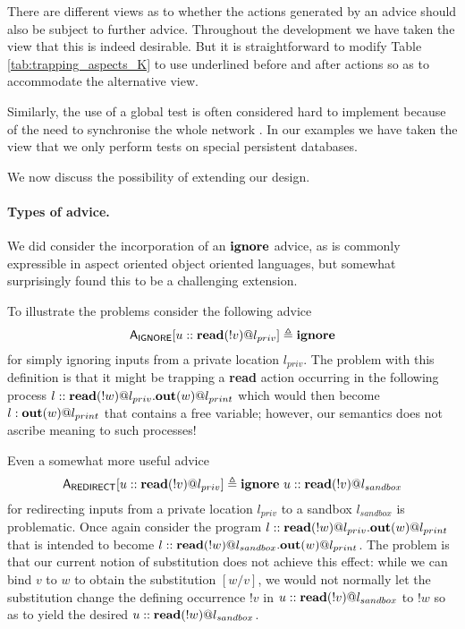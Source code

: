 \documentclass[a4paper]{llncs}
\begin{document}
There are different views as to whether the actions generated by an advice should also be subject to further advice. Throughout the development we have taken the view that this is indeed desirable. But it is straightforward to modify Table \ref{tab:trapping_aspects_K} to use underlined before and after actions so as to accommodate the alternative view. 

Similarly, the use of a global test is often considered hard to implement because of the need to synchronise the whole network \cite{De1998}. In our examples we have taken the view that we only perform tests on special persistent databases.

We now discuss the possibility of extending
our design.

\paragraph{Types of advice.}

We did consider the incorporation of an ${\bf ignore}$ advice, as is
commonly expressible in aspect oriented object oriented languages, but
somewhat surprisingly found this to be a challenging extension.

To illustrate the problems consider the following advice
$${\sf A}_{\sf IGNORE}[u::{\bf read}(!v)@l_{priv}] \triangleq {\bf ignore}$$
for simply ignoring inputs from a private location $l_{priv}$.  The
problem with this definition is that it might be trapping a {\bf read}
action occurring in the following process $l::{\bf
read}(!w)@l_{priv}. {\bf out}(w)@l_{print}$ which would then become
$l:{\bf out}(w)@l_{print}$ that contains a free variable; however, our
semantics does not ascribe meaning to such processes!

Even a somewhat more useful advice
$${\sf A}_{\sf REDIRECT}[u::{\bf read}(!v)@l_{priv}] \triangleq 
  {\bf ignore}\ u::{\bf read}(!v)@l_{sandbox}
$$
for redirecting inputs from a private location $l_{priv}$ to a sandbox
$l_{sandbox}$ is problematic.
Once again consider the program
$l::{\bf read}(!w)@l_{priv}. {\bf out}(w)@l_{print}$
that is intended to become
$l::{\bf read}(!w)@l_{sandbox}. {\bf out}(w)@l_{print}$.
The problem is that our current notion of substitution does not achieve this
effect: while we can bind $v$ to $w$ to obtain the substitution $[w/v]$,
we would not normally let the substitution change the defining occurrence
$!v$ in $u::{\bf read}(!v)@l_{sandbox}$ to $!w$ so as to yield the desired
$u::{\bf read}(!w)@l_{sandbox}$.
\end{document}
